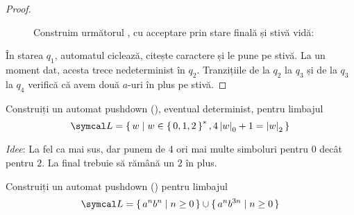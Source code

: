 \begin{proof}~
    \begin{figure}[H]
        \centering
        \caption*{Construim următorul \pda{}, cu acceptare prin stare finală și stivă vidă:}
    \end{figure}

    În starea \(q_1\), automatul ciclează, citește caractere și le pune pe stivă. La un moment dat, acesta trece nedeterminist în \(q_2\). Tranzițiile de la \(q_2\) la \(q_3\) și de la \(q_3\) la \(q_4\) verifică că avem două \(a\)-uri în plus pe stivă.
\end{proof}

\begin{exercise}
    Construiți un automat pushdown (\pda{}), eventual determinist, pentru limbajul
    \[
        \lang = \set{ w | w \in \set{0, 1, 2}^*, 4\abs{w}_0 + 1 = \abs{w}_2 }
    \]
\end{exercise}

\textit{Idee}: La fel ca mai sus, dar punem de 4 ori mai multe simboluri pentru \(0\) decât pentru \(2\). La final trebuie să rămână un \(2\) în plus.

\begin{exercise}
    Construiți un automat pushdown (\pda{}) pentru limbajul
    \[
        \lang = \set{ a^n b^n | n \geq 0 } \cup \set{ a^n b^{3n} | n \geq 0 }
    \]
\end{exercise}

